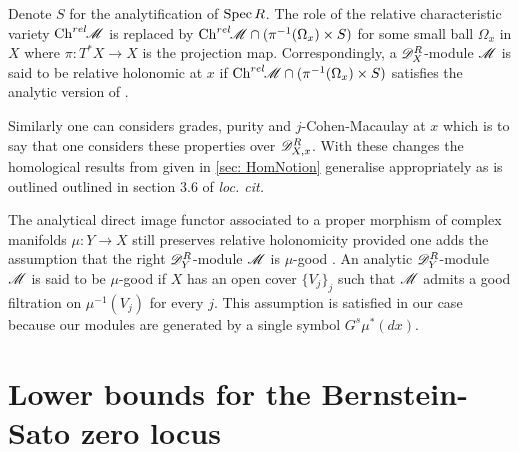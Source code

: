 Denote $S$ for the analytification of $\operatorname{Spec} R$.
The role of the relative characteristic variety $\operatorname{Ch}^{rel}\mkern-5mu\mathscr{M}$ is replaced by $\operatorname{Ch}^{rel}\mkern-5mu\mathscr{M} \cap (\pi^{-1}(\Omega_x)\times S)$ for some small ball $\Omega_x$ in $X$ where $\pi:T^*X\to X$ is the projection map.
Correspondingly, a $\mathscr{D}_X^R$-module $\mathscr{M}$ is said to be relative holonomic at $x$ if $\operatorname{Ch}^{rel}\mkern-5mu\mathscr{M} \cap (\pi^{-1}(\Omega_x)\times S)$ satisfies the analytic version of .

Similarly one can considers grades, purity and $j$-Cohen-Macaulay at $x$ which is to say that one considers these properties over $\mathscr{D}_{X,x}^R$.
With these changes the homological results from \cite{budur2020zeroI} given in \cref{sec: HomNotion} generalise appropriately as is outlined outlined in section 3.6 of {\it loc. cit.}

The analytical direct image functor associated to a proper morphism of complex manifolds $\mu:Y\to X$ still preserves relative holonomicity provided one adds the assumption that the right $\mathscr{D}_Y^R$-module $\mathscr{M}$ is $\mu$-good \cite[Theorem 1.17]{AnalyticDirectIm}.
An analytic $\mathscr{D}_Y^R$-module $\mathscr{M}$ is said to be $\mu$-good if $X$ has an open cover $\{V_j\}_j$ such that $\mathscr{M}$ admits a good filtration on $\mu^{-1}(V_j)$ for every $j$.
This assumption is satisfied in our case because our modules are generated by a single symbol $G^s\mu^*(dx)$.
\section{Lower bounds for the Bernstein-Sato zero locus}\label{sec: LowerBound}
